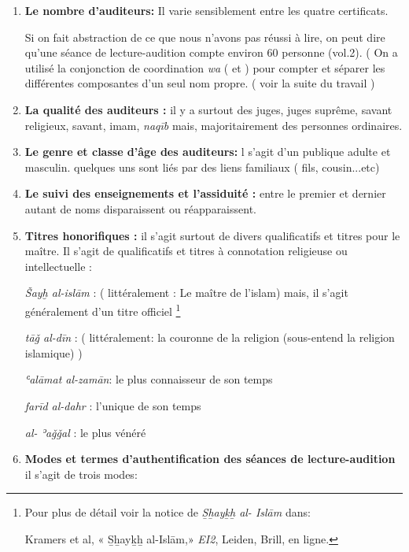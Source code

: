 \documentclass[a4paper,12pt]{report}
\begin{document}
\begin{itemize}
\begin{enumerate}
\begin{enumerate}
  	certificat  de  lecteur- audition collectif,  Vol.4. lig : 27 dit : \textit{Kātib al-samā ʿ} ( le scripteur de l’acte de lecture-audition )


\item \textbf{Le nombre d’auditeurs:} Il varie sensiblement entre les quatre certificats.

Si on fait abstraction de ce que nous n'avons pas réussi à lire, on peut dire qu'une séance de lecture-audition compte environ 60 personne (vol.2). 
( On a utilisé la conjonction de coordination  \textit{wa} ( et ) pour compter et séparer les différentes composantes d'un seul nom propre. ( voir la suite du travail )  

\item \textbf{ La qualité des auditeurs :}  il y a surtout des juges, juges suprême, savant religieux, savant, imam, \textit{naq\=ib} mais, majoritairement des personnes ordinaires.   
\item \textbf{ Le genre et classe d'âge des auditeurs:}
l s'agit d'un publique  adulte  et masculin. quelques uns sont liés par des liens familiaux ( fils, cousin...etc) 
\item \textbf{Le suivi des enseignements et l’assiduité :} entre le premier et dernier autant de noms disparaissent ou réapparaissent.   

\item \textbf{Titres honorifiques :} il s'agit surtout de divers qualificatifs et titres pour le maître. Il s'agit de qualificatifs et titres à connotation religieuse  ou intellectuelle  :

 \textit{Šayḫ al-islām} : ( littéralement : Le maître de l'islam) mais, il s'agit  généralement d'un titre officiel  \footnote{Pour plus de détail voir la notice de  \textit{S̲h̲ayk̲h̲ al- Islām}  dans:
  
Kramers et al,  « S̲h̲ayk̲h̲ al-Islām,»\textit{ EI2}, Leiden, Brill, en ligne.} 

 \textit {tāǧ al-dīn} : ( littéralement: la couronne de la religion (sous-entend la religion islamique) ) 

 \textit{ʿalāmat al-zamān}: le plus connaisseur de son temps 


 \textit{farīd al-dahr} : l'unique de son temps

 \textit{al- ʾaǧǧal} : le plus vénéré

\item \textbf{ Modes et termes d’authentification  des séances de lecture-audition} il s'agit de trois modes:



\end{enumerate}
\end{enumerate}
\end{itemize}
\end{document}
